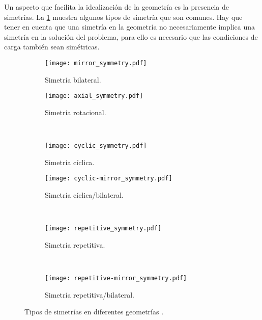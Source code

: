 Un aspecto que facilita la idealización de la geometría es la presencia de simetrías. La \cref{fig:simetrias} muestra algunos tipos de simetría que son comunes. Hay que tener en cuenta que una simetría en la geometría no necesariamente implica una simetría en la solución del problema, para ello es necesario que las condiciones de carga también sean simétricas.
\begin{figure}[H]
    \centering
    \begin{subfigure}[b]{0.49\textwidth}
    \centering
	\texttt{[image: mirror\_symmetry.pdf]}
	\caption{Simetría bilateral.}
	\end{subfigure}
    \begin{subfigure}[b]{0.49\textwidth}
    \centering
	\texttt{[image: axial\_symmetry.pdf]}
	\caption{Simetría rotacional.}
	\end{subfigure}\\	
	\begin{subfigure}[b]{0.49\textwidth}
	\centering
	\texttt{[image: cyclic\_symmetry.pdf]}
	\caption{Simetría cíclica.}
	\end{subfigure}
    \begin{subfigure}[b]{0.49\textwidth}
    \centering
	\texttt{[image: cyclic-mirror\_symmetry.pdf]}
	\caption{Simetría cíclica/bilateral.}
	\end{subfigure}\\
    \begin{subfigure}[b]{\textwidth}
    \centering
	\texttt{[image: repetitive\_symmetry.pdf]}
	\caption{Simetría repetitiva.}
	\end{subfigure}\\
    \begin{subfigure}[b]{\textwidth}
    \centering
	\texttt{[image: repetitive-mirror\_symmetry.pdf]}
	\caption{Simetría repetitiva/bilateral.}
	\end{subfigure}
    \caption{Tipos de simetrías en diferentes geometrías \cite{how_to_FEM}.}
    \label{fig:simetrias}
\end{figure}


